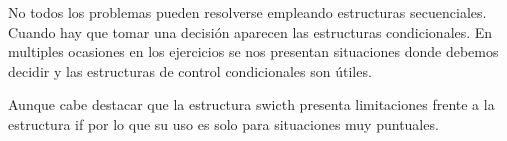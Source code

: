No todos los problemas pueden resolverse empleando estructuras secuenciales. Cuando hay que tomar una decisión aparecen las estructuras condicionales. En multiples ocasiones en los ejercicios se nos presentan situaciones donde debemos decidir y las estructuras de control condicionales son útiles. 

Aunque cabe destacar que la estructura swicth presenta limitaciones frente a la estructura if por lo que su uso es solo para situaciones muy puntuales.